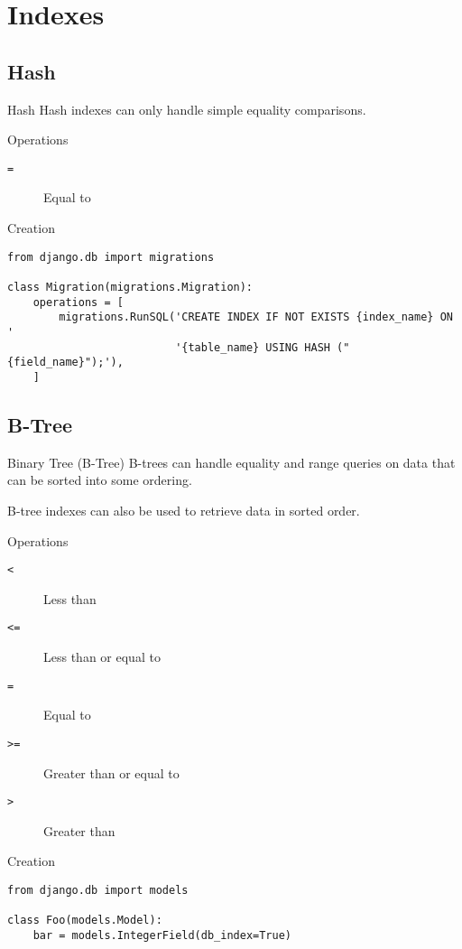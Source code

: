 \section{Indexes}
\subsection{Hash}
\begin{frame}[fragile]{Hash}
    Hash indexes can only handle simple equality comparisons.

    \begin{block}{Operations}
        \begin{description}
            \item[\texttt{=}] Equal to
        \end{description}
    \end{block}

    \begin{block}{Creation}
        \begin{verbatim}
from django.db import migrations

class Migration(migrations.Migration):
    operations = [
        migrations.RunSQL('CREATE INDEX IF NOT EXISTS {index_name} ON '
                          '{table_name} USING HASH ("{field_name}");'),
    ]
        \end{verbatim}
    \end{block}
\end{frame}

\subsection{B-Tree}
\begin{frame}[fragile]{Binary Tree (B-Tree)}
    B-trees can handle equality and range queries on data that can be sorted into some ordering.
    
    B-tree indexes can also be used to retrieve data in sorted order.

    \begin{block}{Operations}
        \begin{description}
            \item[\texttt{<}] Less than
            \item[\texttt{<}\texttt{=}] Less than or equal to
            \item[\texttt{=}] Equal to
            \item[\texttt{>}\texttt{=}] Greater than or equal to
            \item[\texttt{>}] Greater than
        \end{description}
    \end{block}

    \begin{block}{Creation}
        \begin{verbatim}
from django.db import models

class Foo(models.Model):
    bar = models.IntegerField(db_index=True)
        \end{verbatim}
    \end{block}
\end{frame}

